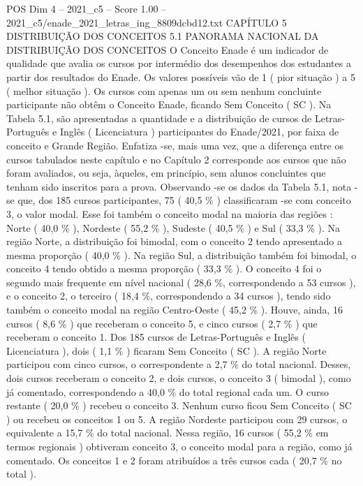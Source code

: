 \begin{textsample}{POS Dim 4 – 2021\_c5 – Score 1.00 – 2021\_c5/enade\_2021\_letras\_ing\_8809dcbd12.txt}  \label{ex:f4_pos_219}
CAPÍTULO 5 DISTRIBUIÇÃO DOS CONCEITOS 5.1 PANORAMA NACIONAL DA DISTRIBUIÇÃO DOS CONCEITOS O Conceito Enade é um indicador de qualidade que avalia os cursos por intermédio dos desempenhos dos estudantes a partir dos resultados do Enade.
Os valores possíveis vão de 1 ( pior situação ) a 5 ( melhor situação ).
Os cursos com apenas um ou sem nenhum concluinte participante não obtêm o Conceito Enade, ficando Sem Conceito ( SC ).
Na Tabela 5.1, são apresentadas a quantidade e a distribuição de cursos de Letras-Português e Inglês ( Licenciatura ) participantes do Enade/2021, por faixa de conceito e Grande Região.
Enfatiza -se, mais uma vez, que a diferença entre os cursos tabulados neste capítulo e no Capítulo 2 corresponde aos cursos que não foram avaliados, ou seja, àqueles, em princípio, sem alunos concluintes que tenham sido inscritos para a prova.
Observando -se os dados da Tabela 5.1, nota -se que, dos 185 cursos participantes, 75 ( 40,5 \% ) classificaram -se com conceito 3, o valor modal.
Esse foi também o conceito modal na maioria das regiões : Norte ( 40,0 \% ), Nordeste ( 55,2 \% ), Sudeste ( 40,5 \% ) e Sul ( 33,3 \% ).
Na região Norte, a distribuição foi bimodal, com o conceito 2 tendo apresentado a mesma proporção ( 40,0 \% ).
Na região Sul, a distribuição também foi bimodal, o conceito 4 tendo obtido a mesma proporção ( 33,3 \% ).
O conceito 4 foi o segundo mais frequente em nível nacional ( 28,6 \%, correspondendo a 53 cursos ), e o conceito 2, o terceiro ( 18,4 \%, correspondendo a 34 cursos ), tendo sido também o conceito modal na região Centro-Oeste ( 45,2 \% ).
Houve, ainda, 16 cursos ( 8,6 \% ) que receberam o conceito 5, e cinco cursos ( 2,7 \% ) que receberam o conceito 1.
Dos 185 cursos de Letras-Português e Inglês ( Licenciatura ), dois ( 1,1 \% ) ficaram Sem Conceito ( SC ).
A região Norte participou com cinco cursos, o correspondente a 2,7 \% do total nacional.
Desses, dois cursos receberam o conceito 2, e dois cursos, o conceito 3 ( bimodal ), como já comentado, correspondendo a 40,0 \% do total regional cada um.
O curso restante ( 20,0 \% ) recebeu o conceito 3.
Nenhum curso ficou Sem Conceito ( SC ) ou recebeu os conceitos 1 ou 5.
A região Nordeste participou com 29 cursos, o equivalente a 15,7 \% do total nacional.
Nessa região, 16 cursos ( 55,2 \% em termos regionais ) obtiveram conceito 3, o conceito modal para a região, como já comentado.
Os conceitos 1 e 2 foram atribuídos a três cursos cada ( 20,7 \% no total ).

\end{textsample}
